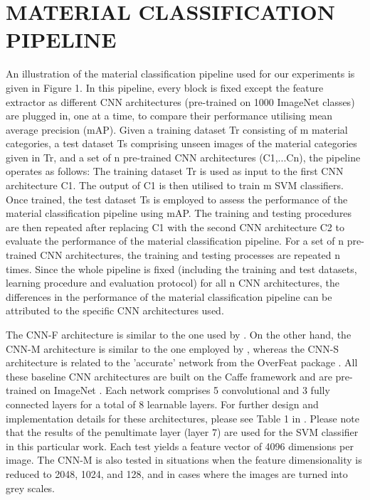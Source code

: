 \documentclass[a4paper,twoside]{article}
\begin{document}
\section{\uppercase{MATERIAL CLASSIFICATION PIPELINE}}
\noindent An illustration of the material classification pipeline used for our experiments is given in Figure 1. In this pipeline, every block is fixed except the feature extractor as different CNN architectures (pre-trained on 1000 ImageNet classes) are plugged in, one at a time, to compare their performance utilising mean average precision (mAP). Given a training dataset Tr consisting of m material categories, a test dataset Ts comprising unseen images of the material categories given in Tr, and a set of n pre-trained CNN architectures (C1,...Cn), the pipeline operates as follows: The training dataset Tr is used as input to the first CNN architecture C1. The output of C1 is then utilised to train m SVM classifiers. Once trained, the test dataset Ts is employed to assess the performance of the material classification pipeline using mAP. The training and testing procedures are then repeated after replacing C1 with the second CNN architecture C2 to evaluate the performance of
the material classification pipeline. For a set of n pre-trained CNN architectures, the training and testing processes are repeated n times. Since the whole pipeline is fixed (including the training and test datasets, learning procedure and evaluation protocol) for all n CNN architectures, the differences in the performance of the material classification pipeline can be attributed to the specific CNN architectures used.

The CNN-F architecture is similar to the one used by \cite{3}. On the other hand, the CNN-M architecture is similar to the one employed by \cite{4}, whereas the CNN-S architecture is related to the 'accurate' network from the OverFeat package \cite{5}. All these baseline CNN architectures are built on the Caffe framework \cite{22} and are pre-trained on ImageNet \cite{23}. Each network comprises 5 convolutional and 3 fully connected layers for a total of 8 learnable layers. For further design and implementation details for these architectures, please see Table 1 in \cite{20}. Please note that the results of the penultimate layer (layer 7) are used for the SVM classifier in this particular work. Each test yields a feature vector of 4096 dimensions per image. The CNN-M is also tested in situations when the feature dimensionality is reduced to 2048, 1024, and 128, and in cases where the images are turned into grey scales.
\end{document}

